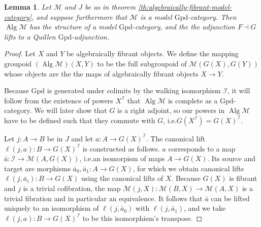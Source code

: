 \documentclass[a4paper]{article}
\newtheorem{lemma}[theorem]{Lemma}
\theoremstyle{remark}
\theoremstyle{definition}
\begin{document}
\begin{lemma}
  \label{lem:algebraically-fibrant-lproper-simplicial}
  Let $\mathcal{M}$ and $J$ be as in theorem \ref{th:algebraically-fibrant-model-category}, and suppose furthermore that $\mathcal{M}$ is a model $\mathrm{Gpd}$-category.
  Then $\operatorname{Alg} \mathcal{M}$ has the structure of a model $\mathrm{Gpd}$-category, and the the adjunction $F \dashv G$ lifts to a Quillen $\mathrm{Gpd}$-adjunction.
\end{lemma}
\begin{proof}
  Let $X$ and $Y$ be algebraically fibrant objects.
  We define the mapping groupoid $(\operatorname{Alg} \mathcal{M})(X, Y)$ to be the full subgroupoid of $\mathcal{M}(G(X), G(Y))$ whose objects are the the maps of algebraically fibrant objects $X \rightarrow Y$.

  Because $\mathrm{Gpd}$ is generated under colimits by the walking isomorphism $\mathcal{I}$, it will follow from the existence of powers $X^\mathcal{I}$ that $\operatorname{Alg} \mathcal{M}$ is complete as a $\mathrm{Gpd}$-category.
  We will later show that $G$ is a right adjoint, so our powers in $\operatorname{Alg} \mathcal{M}$ have to be defined such that they commute with $G$, i.e.\@ $G(X^\mathcal{I}) = G(X)^\mathcal{I}$.

  Let $j : A \rightarrow B$ be in $J$ and let $a : A \rightarrow G(X)^\mathcal{I}$.
  The canonical lift $\ell(j, a) : B \rightarrow G(X)^\mathcal{I}$ is constructed as follows.
  $a$ corresponds to a map $\bar a : \mathcal{I} \rightarrow \mathcal{M}(A, G(X))$, i.e.\@ an isomorpism of maps $A \rightarrow G(X)$.
  Its source and target are morphisms $\bar a_0, \bar a_1 : A \rightarrow G(X)$, for which we obtain canonical lifts $\ell(j, \bar a_i) : B \rightarrow G(X)$ using the canonical lifts of $X$.
  Because $G(X)$ is fibrant and $j$ is a trivial cofibration, the map $\mathcal{M}(j, X) : \mathcal{M}(B, X) \rightarrow \mathcal{M}(A, X)$ is a trivial fibration and in particular an equivalence.
  It follows that $\bar a$ can be lifted uniquely to an isomorphism of $\ell(j, \bar a_0)$ with $\ell(j, \bar a_1)$, and we take $\ell(j, a) : B \rightarrow G(X)^\mathcal{I}$ to be this isomorphism's transpose.


\end{proof}
\end{document}
